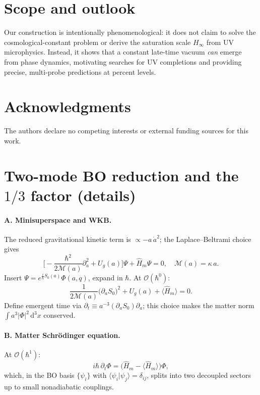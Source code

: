 \documentclass[twocolumn,aps,prd,showpacs,nofootinbib,superscriptaddress]{revtex4-2}
\newcommand{\dd}{\mathrm{d}}
\begin{document}
\section{Scope and outlook}
\label{sec:conclusions}
Our construction is intentionally phenomenological: it does not claim to solve the cosmological-constant problem or derive the saturation scale $H_\infty$ from UV microphysics. Instead, it shows that a constant late-time vacuum \emph{can} emerge from phase dynamics, motivating searches for UV completions and providing precise, multi-probe predictions at percent levels.

\section*{Acknowledgments}
The authors declare no competing interests or external funding sources for this work.

\appendix

\section{Two-mode BO reduction and the $1/3$ factor (details)}
\label{app:twomode}
\paragraph*{A. Minisuperspace and WKB.}
The reduced gravitational kinetic term is $\propto -a\,\dot{a}^2$; the Laplace--Beltrami choice gives
\begin{equation}
\Big[-\frac{\hbar^2}{2\mathcal{M}(a)}\partial_a^2+U_g(a)\Big]\Psi+\hat{H}_m\Psi=0,\quad
\mathcal{M}(a)=\kappa\,a.
\end{equation}
Insert $\Psi=e^{\tfrac{i}{\hbar}S_0(a)}\Phi(a,q)$, expand in $\hbar$. At $\mathcal{O}(\hbar^0)$:
\begin{equation}
\frac{1}{2\mathcal{M}(a)}\big(\partial_a S_0\big)^2+U_g(a)+\langle\hat{H}_m\rangle=0.
\end{equation}
Define emergent time via $\partial_t\equiv a^{-3}(\partial_a S_0)\partial_a$; this choice makes the matter norm $\int a^3 |\Phi|^2\,\dd^3x$ conserved.

\paragraph*{B. Matter Schrödinger equation.}
At $\mathcal{O}(\hbar^1)$:
\begin{equation}
i\hbar\,\partial_t \Phi=\big(\hat{H}_m-\langle\hat{H}_m\rangle\big)\Phi,
\end{equation}
which, in the BO basis $\{\psi_i\}$ with $\langle\psi_i|\psi_j\rangle=\delta_{ij}$, splits into two decoupled sectors up to small nonadiabatic couplings.
\end{document}
